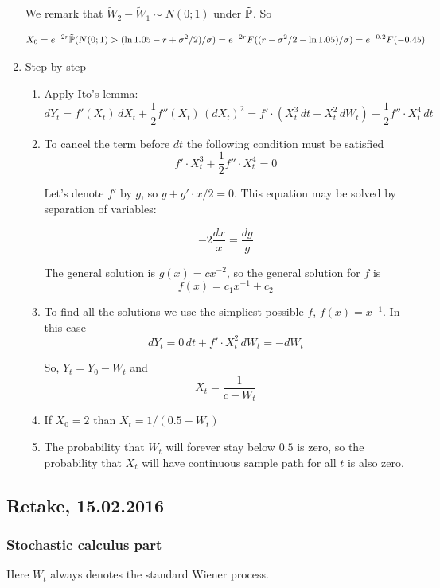 \documentclass[12pt, a4paper]{article}
\begin{document}
\begin{enumerate}
We remark that $\tilde W_2 - \tilde W_1 \sim N(0; 1)$ under $\tilde \P$. So

\[
X_0 = e^{-2r} \tilde \P( N(0; 1) > (\ln 1.05 - r + \sigma^2/2)/\sigma ) = e^{-2r}F((r-\sigma^2/2 - \ln 1.05)/\sigma) = e^{-0.2}F(-0.45)
\]


\item Step by step
\begin{enumerate}
\item Apply Ito's lemma:
\[
dY_t = f'(X_t) \, dX_t + \frac{1}{2} f''(X_t) \, (dX_t)^2 = f'\cdot (X_t^3 \, dt + X_t^2 \, dW_t) + \frac{1}{2}f''\cdot X_t^4 \, dt
\]
\item To cancel the term before $dt$ the following condition must be satisfied
\[
f' \cdot X_t^3 + \frac{1}{2} f'' \cdot X_t^4 = 0
\]

Let's denote $f'$ by $g$, so $g + g'\cdot x /2 = 0$. This equation may be solved by separation of variables:

\[
-2\frac{dx}{x}=\frac{dg}{g}
\]

The general solution is $g(x)=c x^{-2}$, so the general solution for $f$ is
\[
f(x)=c_1 x^{-1} + c_2
\]

\item To find all the solutions we use the simpliest possible $f$, $f(x)=x^{-1}$. In this case
\[
dY_t= 0\, dt + f' \cdot X_t^2 \, dW_t = - dW_t
\]

So, $Y_t = Y_0 - W_t$ and
\[
X_t = \frac{1}{c - W_t}
\]

\item If $X_0=2$ than $X_t = 1/ (0.5 - W_t)$

\item The probability that $W_t$ will forever stay below $0.5$ is zero, so the probability that $X_t$ will have continuous sample path for all $t$ is also zero.

\end{enumerate}

\end{enumerate}


\subsection{Retake, 15.02.2016}

\subsubsection*{Stochastic calculus part}


Here $W_t$ always denotes the standard Wiener process.
\end{document}
